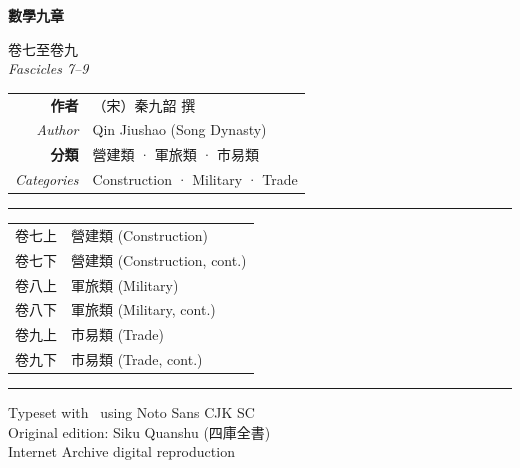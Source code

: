 \documentclass[11pt,a4paper]{article}
\newcommand{\shortline}{\noindent\rule{0.5\textwidth}{0.4pt}\par}
\begin{document}
\begin{titlepage}
\centering
\vspace*{2cm}

{\fontsize{28}{36}\selectfont\color{titlecolor}
\textbf{數學九章}
}

\vspace{1.5cm}

{\fontsize{16}{20}\selectfont\color{sectioncolor}
卷七至卷九\\[0.5em]
\textit{Fascicles 7--9}
}

\vspace{2cm}

{\large
\begin{tabular}{rl}
\textbf{作者} & （宋）秦九韶 撰 \\
\textit{Author} & Qin Jiushao (Song Dynasty) \\
\textbf{分類} & 營建類 · 軍旅類 · 市易類 \\
\textit{Categories} & Construction · Military · Trade \\
\end{tabular}
}

\vspace{3cm}

\shortline

\vspace{1cm}

{\large
\begin{tabular}{ll}
卷七上 & 營建類 (Construction) \\
卷七下 & 營建類 (Construction, cont.) \\
卷八上 & 軍旅類 (Military) \\
卷八下 & 軍旅類 (Military, cont.) \\
卷九上 & 市易類 (Trade) \\
卷九下 & 市易類 (Trade, cont.) \\
\end{tabular}
}

\vspace{2cm}

{\color{rulecolor}\rule{0.6\textwidth}{0.6pt}}

\vspace{0.5cm}

{\small\color{sectioncolor}
Typeset with \XeLaTeX\ using Noto Sans CJK SC\\
Original edition: Siku Quanshu (四庫全書)\\
Internet Archive digital reproduction
}

\end{titlepage}
\end{document}
